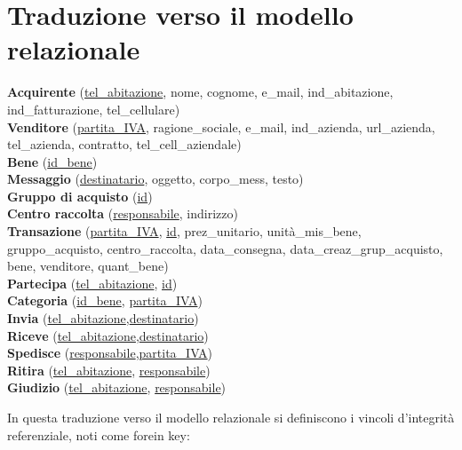\documentclass[a4paper, 10pt]{report}
\begin{document}
\section{Traduzione verso il modello relazionale}
\begin{centering}
\textbf{Acquirente} (\underline{tel\_abitazione}, nome, cognome, e\_mail, ind\_abitazione, ind\_fatturazione, tel\_cellulare)\\
\textbf{Venditore} (\underline{partita\_IVA}, ragione\_sociale, e\_mail, ind\_azienda, url\_azienda, tel\_azienda, contratto, tel\_cell\_aziendale)\\
\textbf{Bene} (\underline{id\_bene})\\
\textbf{Messaggio} (\underline{destinatario}, oggetto, corpo\_mess, testo)\\
\textbf{Gruppo di acquisto} (\underline{id})\\
\textbf{Centro raccolta} (\underline{responsabile}, indirizzo)\\
\textbf{Transazione} (\underline{partita\_IVA}, \underline{id}, prez\_unitario, unit\`a\_mis\_bene, gruppo\_acquisto, centro\_raccolta, data\_consegna, data\_creaz\_grup\_acquisto, bene, venditore, quant\_bene)\\
\textbf{Partecipa} (\underline{tel\_abitazione}, \underline{id})\\
\textbf{Categoria} (\underline{id\_bene}, \underline{partita\_IVA})\\
\textbf{Invia} (\underline{tel\_abitazione},\underline{destinatario})\\
\textbf{Riceve} (\underline{tel\_abitazione},\underline{destinatario})\\
\textbf{Spedisce} (\underline{responsabile},\underline{partita\_IVA})\\
\textbf{Ritira} (\underline{tel\_abitazione}, \underline{responsabile})\\
\textbf{Giudizio} (\underline{tel\_abitazione}, \underline{responsabile})\\
\end{centering}

In questa traduzione verso il modello relazionale si definiscono i vincoli d'integrit\`a referenziale, noti come forein key:\\
\end{document}
